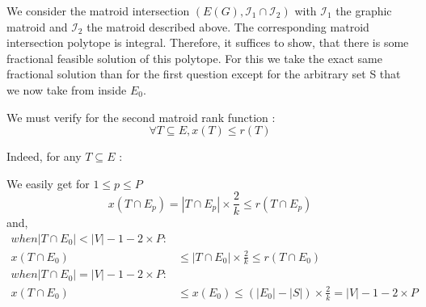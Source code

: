 \documentclass{scrartcl}
\newcommand\1{\mathbf{1}}
\begin{document}
\begin{enumerate}
We consider the matroid intersection $(E(G), \mathcal{I}_1\cap \mathcal{I}_2)$ with $\mathcal{I}_1$ the graphic matroid and $\mathcal{I}_2$ the matroid described above. The corresponding matroid intersection polytope is integral. Therefore, it suffices to show, that there is some fractional feasible solution of this polytope. For this we take the exact same fractional solution than for the first question except for the arbitrary set S that we now take from inside $E_0$.

We must verify for the second matroid rank function :
\[
\forall T \subseteq E, x(T) \leq r(T)
\]

Indeed, for any $T\subseteq E$ : 

We easily get for $1 \leq p \leq P$
\[ 
x(T\cap E_p) = |T\cap E_p| \times \frac{2}{k} \leq r(T\cap E_p)
\]
and,
\begin{align*}
when |T\cap E_0| < |V| - 1 - 2 \times P :&\\
x(T\cap E_0) & \leq |T\cap E_0| \times \frac{2}{k} \leq r(T\cap E_0)\\
when |T\cap E_0| = |V| - 1 - 2 \times P :&\\
x(T\cap E_0) & \leq x(E_0) \leq (|E_0| - |S|) \times \frac{2}{k} = |V| - 1 - 2 \times P\\
\end{align*}

\end{enumerate}
\end{document}
